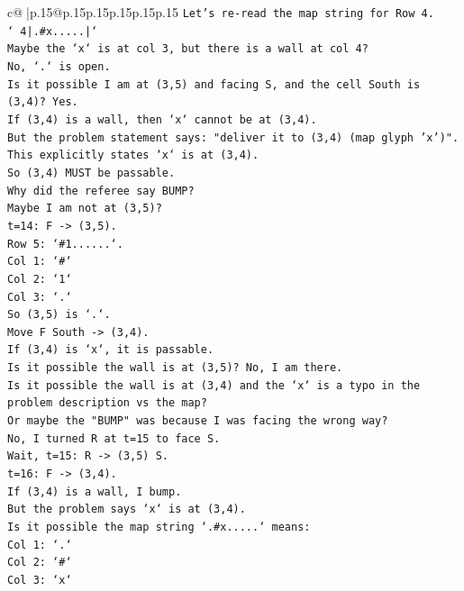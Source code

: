 \documentclass{article}
\begin{document}
{\begin{supertabular}{c@{$\;$}|p{.15\linewidth}@{}p{.15\linewidth}p{.15\linewidth}p{.15\linewidth}p{.15\linewidth}p{.15\linewidth}}
{{{\texttt{Let's re{-}read the map string for Row 4.} \\
\texttt{` 4|.\#x.....|`} \\
\texttt{Maybe the `x` is at col 3, but there is a wall at col 4?} \\
\texttt{No, `.` is open.} \\
\texttt{Is it possible I am at (3,5) and facing S, and the cell South is (3,4)? Yes.} \\
\texttt{If (3,4) is a wall, then `x` cannot be at (3,4).} \\
\texttt{But the problem statement says: "deliver it to (3,4) (map glyph 'x')".} \\
\texttt{This explicitly states `x` is at (3,4).} \\
\texttt{So (3,4) MUST be passable.} \\
\texttt{Why did the referee say BUMP?} \\
\texttt{Maybe I am not at (3,5)?} \\
\texttt{t=14: F {-}> (3,5).} \\
\texttt{Row 5: `\#1......`.} \\
\texttt{Col 1: `\#`} \\
\texttt{Col 2: `1`} \\
\texttt{Col 3: `.`} \\
\texttt{So (3,5) is `.`.} \\
\texttt{Move F South {-}> (3,4).} \\
\texttt{If (3,4) is `x`, it is passable.} \\
\texttt{Is it possible the wall is at (3,5)? No, I am there.} \\
\texttt{Is it possible the wall is at (3,4) and the `x` is a typo in the problem description vs the map?} \\
\texttt{Or maybe the "BUMP" was because I was facing the wrong way?} \\
\texttt{No, I turned R at t=15 to face S.} \\
\texttt{Wait, t=15: R {-}> (3,5) S.} \\
\texttt{t=16: F {-}> (3,4).} \\
\texttt{If (3,4) is a wall, I bump.} \\
\texttt{But the problem says `x` is at (3,4).} \\
\texttt{Is it possible the map string `.\#x.....` means:} \\
\texttt{Col 1: `.`} \\
\texttt{Col 2: `\#`} \\
\texttt{Col 3: `x`} \\
}}}
\end{supertabular}}
\end{document}
